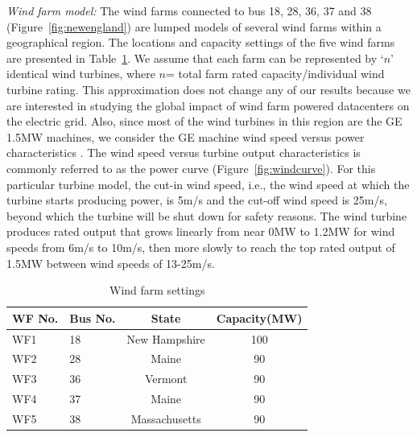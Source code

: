 {\em Wind farm model:}
The wind farms connected to bus 18, 28, 36, 37 and 38 (Figure~\ref{fig:newengland}) are lumped models of several wind farms within a geographical region. The locations and capacity settings of the five wind farms are presented in Table~\ref{tab:wf_setting}. We assume that each farm can be represented by `$n$' identical wind turbines, where $n$= total farm rated capacity/individual wind turbine rating. This approximation does not change any of our results because we are interested in studying the global impact of wind farm powered datacenters on the electric grid. Also, since most of the wind turbines in this region are the GE 1.5MW machines, we consider the GE machine wind speed versus power characteristics \cite{lei2006modeling}. The wind speed versus turbine output characteristics is commonly referred to as the power curve (Figure~\ref{fig:windcurve}).  For this particular turbine model, the cut-in wind speed, i.e., the wind speed at which the turbine starts producing power, is 5m/s and the cut-off wind speed is 25m/s, beyond which the turbine will be shut down for safety reasons. The wind turbine produces rated output that grows linearly from near 0MW to 1.2MW for wind speeds from 6m/s to 10m/s, then more slowly to reach the top rated output of 
1.5MW between wind speeds of 13-25m/s.



\begin{table}[ht]
\begin{center}
\caption{Wind farm settings}
\begin{tabular}{|l|l|c|c|}
\hline
WF No. & Bus No. & State & Capacity(MW) \\
\hline
WF1 & 18& New Hampshire & 100\\
WF2 & 28& Maine & 90 \\
WF3 & 36& Vermont & 90  \\
WF4 & 37& Maine & 90\\
WF5 & 38& Massachusetts & 90\\
\hline

\end{tabular}
   \vspace{.05in}
\label{tab:wf_setting}
\end{center}
\end{table}

